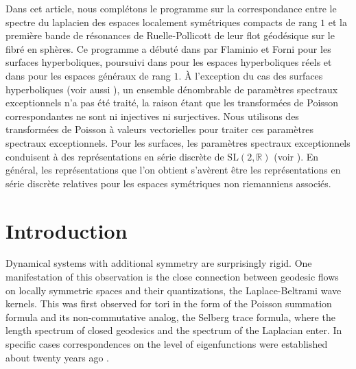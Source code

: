 \documentclass[JEP,XML,SOM,NoFloatCountersInSection,Unicode,published]{cedram}
\theoremstyle{definition}
\begin{document}

\begin{altabstract}
Dans cet article, nous complétons le programme sur la correspondance entre le spectre du laplacien des espaces localement symétriques compacts de rang $1$ et la première bande de résonances de Ruelle-Pollicott de leur flot géodésique sur le fibré en sphères. Ce programme a débuté dans \cite{FF03} par Flaminio et Forni pour les surfaces hyperboliques, poursuivi dans \cite{DFG} pour les espaces hyperboliques réels et dans \cite{GHWb} pour les espaces généraux de rang $1$. À l'exception du cas des surfaces hyperboliques (voir aussi \cite{GHWa}), un ensemble dénombrable de paramètres spectraux exceptionnels n’a pas été traité, la raison étant que les transformées de Poisson correspondantes ne sont ni injectives ni surjectives. Nous utilisons des transformées de Poisson à valeurs vectorielles pour traiter ces paramètres spectraux exceptionnels. Pour les surfaces, les paramètres spectraux exceptionnels conduisent à des représentations en série discrète de $\mathrm{SL}(2,\mathbb R)$ (voir \cite{FF03, GHWa}). En général, les représentations que l'on obtient s'avèrent être les représentations en série discrète relatives pour les espaces symétriques non riemanniens associés.\end{altabstract}
\maketitle
\vspace*{-\baselineskip}
\tableofcontents
\mainmatter

\vspace*{-3\baselineskip}\mbox{}
\section{Introduction}
Dynamical systems with additional symmetry are surprisingly rigid. One manifestation of this observation is the close connection between geodesic flows on locally symmetric spaces and their quantizations, the Laplace-Beltrami wave kernels. This was first observed for tori in the form of the Poisson summation formula and its non-commutative analog, the Selberg trace formula, where the length spectrum of closed geodesics and the spectrum of the Laplacian enter. In specific cases correspondences on the level of eigenfunctions were established about twenty years ago \cite{LZ01,FF03,DH05,M06,Poh12}.
\end{document}
